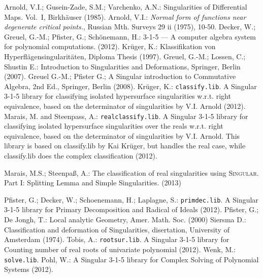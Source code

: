 \documentclass[noend]{amsproc}
\theoremstyle{definition}
\begin{document}
 \begin{thebibliography}{99}
 Arnold, V.I.; Gusein-Zade, S.M.; Varchenko, A.N.:
Singularities of Differential Maps. Vol.~I, Birkh\"auser (1985).
 Arnold, V.I.:
\textit{Normal form of functions near degenerate critical points.},
Russian Mth. Surveys 29 ii (1975), 10-50.
Decker, W.; Greuel, G.-M.; Pfister, G.; Sch{\"o}nemann, H.:
 {3-1-5} --- {A} computer algebra system for polynomial
computations.
 (2012).
 Kr\"uger, K.: Klassifikation von
Hyperfl\"agensingularit\"aten, Diploma Thesis (1997).
Greuel, G.-M.; Lossen, C.; Shustin E.:
Introduction to Singularities and Deformations, Springer, Berlin (2007).
 Greuel G.-M.; Pfister G.;
A Singular introduction to Commutative Algebra, 2nd Ed., Springer,
Berlin (2008).
Kr\"uger, K.:
{\tt classify.lib}. {A} {\sc Singular} {3-1-5} library for classifying isolated
hypersurface singularities w.r.t. right equivalence, based on the determinator
of singularities by V.I. Arnold (2012).
Marais, M. and Steenpass, A.:
{\tt realclassify.lib}. {A} {\sc Singular} {3-1-5} library for classifying
isolated hypersurface singularities over the reals w.r.t. right equivalence,
based on the determinator of singularities by V.I. Arnold. This library is
based on classify.lib by Kai Kr\"uger, but handles the real case, while
classify.lib does the complex classification (2012).

Marais, M.S.; Steenpa\ss, A.:
The classification of real singularities using \textsc{Singular}. Part I: Splitting Lemma and Simple Singularities. (2013)

 Pfister, G.; Decker, W.;  Schoenemann, H.; Laplagne, S.:
{\tt primdec.lib}. {A} {\sc Singular} {3-1-5} library for Primary Decomposition
and Radical of Ideals (2012).
Pfister, G.; De Jongh, T.:
Local analytic Geometry, Amer. Math. Soc. (2000)
 Siersma D.: Classification and deformation of Singularities,
disertation, University of Amsterdam (1974).
Tobis, A.:
{\tt rootsur.lib}. {A} {\sc Singular} {3-1-5} library for Counting number of
real roots of univariate polynomial (2012).
 Wenk, M.: {\tt solve.lib}. Pohl, W.:
{A} {\sc Singular} {3-1-5} library for Complex Solving of Polynomial Systems
(2012).

\end{thebibliography}
\end{document}
